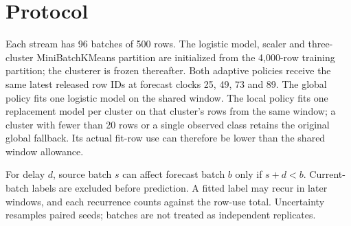 \documentclass[10pt]{article}
\title{\textcolor{navy}{Matched-Opportunity Adaptation}\[3pt]\large Global and Cluster-Local Refitting Under a Shared Row Budget}
\author{23I-2581 and 23I-2604\\Data Analysis and Visualization --- Phase 3 addendum}
\date{17 November 2026}
\begin{document}
\maketitle
\begin{abstract}
This controlled extension holds update clocks and released feedback rows fixed while comparing a frozen classifier with global and cluster-local logistic refits. Thirty paired seeds, three label delays and stationary or abrupt conditional-reversal streams are evaluated. Each adaptive policy receives four opportunities and may use at most 2,000 released rows per opportunity; repeated uses count toward an 8,000-row adaptation cap. Initial training is reported separately.
\end{abstract}
\section{Protocol}
Each stream has 96 batches of 500 rows. The logistic model, scaler and three-cluster MiniBatchKMeans partition are initialized from the 4,000-row training partition; the clusterer is frozen thereafter. Both adaptive policies receive the same latest released row IDs at forecast clocks 25, 49, 73 and 89. The global policy fits one logistic model on the shared window. The local policy fits one replacement model per cluster on that cluster's rows from the same window; a cluster with fewer than 20 rows or a single observed class retains the original global fallback. Its actual fit-row use can therefore be lower than the shared window allowance.

For delay $d$, source batch $s$ can affect forecast batch $b$ only if $s+d<b$. Current-batch labels are excluded before prediction. A fitted label may recur in later windows, and each recurrence counts against the row-use total. Uncertainty resamples paired seeds; batches are not treated as independent replicates.
\end{document}
